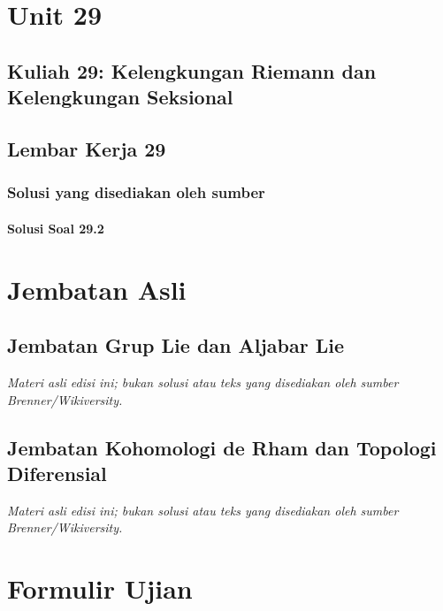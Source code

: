 \documentclass[11pt,a4paper,oneside]{book}
\begin{document}
\part{Unit 29}
\chapter[Kuliah 29]{Kuliah 29: Kelengkungan Riemann dan Kelengkungan Seksional}


\chapter{Lembar Kerja 29}


\section*{Solusi yang disediakan oleh sumber}
\subsection*{Solusi Soal 29.2}


\part{Jembatan Asli}
\chapter{Jembatan Grup Lie dan Aljabar Lie}
\noindent\textit{Materi asli edisi ini; bukan solusi atau teks yang disediakan oleh sumber Brenner/Wikiversity.}



\chapter{Jembatan Kohomologi de Rham dan Topologi Diferensial}
\noindent\textit{Materi asli edisi ini; bukan solusi atau teks yang disediakan oleh sumber Brenner/Wikiversity.}



\part{Formulir Ujian}
\end{document}
